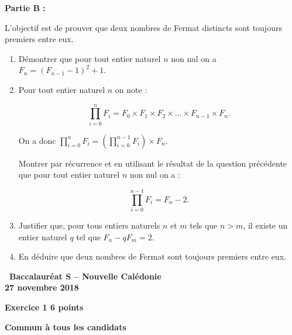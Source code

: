\documentclass[10pt,a4paper]{article}
\begin{document}
\medskip

\textbf{Partie B :}

\medskip

L'objectif est de prouver que deux nombres de Fermat distincts sont toujours premiers entre eux.

\medskip

\begin{enumerate}
\item Démontrer que pour tout entier naturel $n$ non nul on a $F_n = \left(F_{n-1}  - 1\right)^2  + 1$.
\item Pour tout entier naturel $n$ on note :

\[\displaystyle\prod_{i=0}^n F_i = F_0 \times F_1 \times F_2 \times \ldots \times F_{n-1} \times F_n.\]

On a donc $\displaystyle\prod_{i=0}^{n} F_i = \left(\prod_{i=0}^{n-1} F_i\right) \times F_n$.

Montrer par récurrence et en utilisant le résultat de la question précédente que pour tout entier naturel $n$ non nul on a :

\[\displaystyle\prod_{i=0}^{n-1} F_i = F_n - 2.\]

\item Justifier que, pour tous entiers naturels $n$ et $m$ tels que $n > m$, il existe un entier naturel $q$ tel que $F_n -qF_m = 2$.
\item En déduire que deux nombres de Fermat sont toujours premiers entre eux.
\end{enumerate}
\newpage
\hypertarget{Caledonienov}{}

\label{Caledonienov}

\addtolength{\headheight}{\baselineskip}
\pagestyle{fancy}
\thispagestyle{empty}
\begin{center}
{\Large \textbf{\decofourleft~Baccalauréat S -- Nouvelle Calédonie~\decofourright\\[7pt]
27 novembre 2018}}
\end{center}

\vspace{0,25cm}

\textbf{Exercice 1 \hfill 6 points}

\medskip

\textbf{Commun à tous les candidats}
\end{document}
